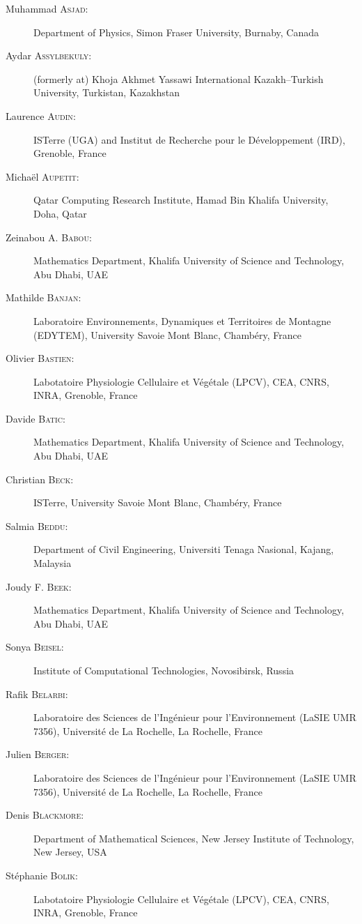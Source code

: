 \documentclass[final, a4paper, oneside, 12pt]{article}
\numberwithin{equation}{section}
\begin{document}
\begin{description}
  \item[Muhammad \textsc{Asjad}:] Department of Physics, Simon Fraser University, Burnaby, Canada
  \item[Aydar \textsc{Assylbekuly}:] (formerly at) Khoja Akhmet Yassawi International Kazakh--Turkish University, Turkistan, Kazakhstan
  \item[Laurence \textsc{Audin}:] ISTerre (UGA) and Institut de Recherche pour le D\'eveloppement (IRD), Grenoble, France
  \item[Micha\"el \textsc{Aupetit}:] Qatar Computing Research Institute, Hamad Bin Khalifa University, Doha, Qatar
  \item[Zeinabou A. \textsc{Babou}:] Mathematics Department, Khalifa University of Science and Technology, Abu Dhabi, UAE
  \item[Mathilde \textsc{Banjan}:] Laboratoire Environnements, Dynamiques et Territoires de Montagne (EDYTEM), University Savoie Mont Blanc, Chamb\'ery, France
  \item[Olivier \textsc{Bastien}:] Labotatoire Physiologie Cellulaire et V\'eg\'etale (LPCV), CEA, CNRS, INRA, Grenoble, France
  \item[Davide \textsc{Batic}:] Mathematics Department, Khalifa University of Science and Technology, Abu Dhabi, UAE
  \item[Christian \textsc{Beck}:] ISTerre, University Savoie Mont Blanc, Chamb\'ery, France
  \item[Salmia \textsc{Beddu}:] Department of Civil Engineering, Universiti Tenaga Nasional, Kajang, Malaysia
  \item[Joudy F. \textsc{Beek}:] Mathematics Department, Khalifa University of Science and Technology, Abu Dhabi, UAE
  \item[Sonya \textsc{Beisel}:] Institute of Computational Technologies, Novosibirsk, Russia
  \item[Rafik \textsc{Belarbi}:] Laboratoire des Sciences de l'Ing\'enieur pour l'Environnement (LaSIE UMR 7356), Universit\'e de La Rochelle, La Rochelle, France
  \item[Julien \textsc{Berger}:] Laboratoire des Sciences de l'Ing\'enieur pour l'Environnement (LaSIE UMR 7356), Universit\'e de La Rochelle, La Rochelle, France
  \item[Denis \textsc{Blackmore}:] Department of Mathematical Sciences, New Jersey Institute of Technology, New Jersey, USA
  \item[St\'ephanie \textsc{Bolik}:] Labotatoire Physiologie Cellulaire et V\'eg\'etale (LPCV), CEA, CNRS, INRA, Grenoble, France

\end{description}
\end{document}
